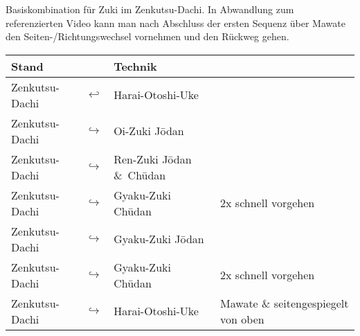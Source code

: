 	\null\vfill\null
	\begin{center}
		\parbox{\textwidth-2\tabcolsep}{Basiskombination für Zuki im Zenkutsu-Dachi. In Abwandlung zum referenzierten Video kann man nach Abschluss der ersten Sequenz über Mawate den Seiten-/Richtungswechsel vornehmen und den Rückweg gehen.}
	\end{center}
	\begin{tabularx}{\textwidth}{lllX}
		Stand	&&Technik	&\\
		\midrule
		Zenkutsu-Dachi 	& \(\hookleftarrow\) & Harai-Otoshi-Uke	&\\
		Zenkutsu-Dachi 	& \(\hookrightarrow\) & Oi-Zuki J\={o}dan	&\\
		Zenkutsu-Dachi 	& \(\hookrightarrow\) & Ren-Zuki J\={o}dan \&~Ch\={u}dan	&\\
		Zenkutsu-Dachi 	& \(\hookrightarrow\) & Gyaku-Zuki Ch\={u}dan	&2x schnell vorgehen\\
		Zenkutsu-Dachi 	& \(\hookrightarrow\) & Gyaku-Zuki J\={o}dan	&\\
		Zenkutsu-Dachi 	& \(\hookrightarrow\) & Gyaku-Zuki Ch\={u}dan	&2x schnell vorgehen\\
		Zenkutsu-Dachi 	& \(\hookrightarrow\) & Harai-Otoshi-Uke	& Mawate \& seitengespiegelt von oben\\
		\midrule
	\end{tabularx}\\\null\vfill\null